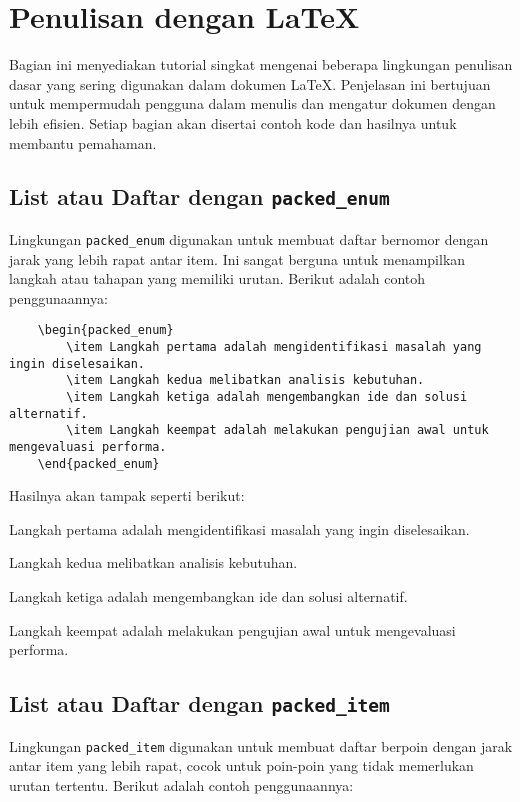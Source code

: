 \section{Penulisan dengan \LaTeX}
Bagian ini menyediakan tutorial singkat mengenai beberapa lingkungan penulisan dasar yang sering digunakan dalam dokumen LaTeX. Penjelasan ini bertujuan untuk mempermudah pengguna dalam menulis dan mengatur dokumen dengan lebih efisien. Setiap bagian akan disertai contoh kode dan hasilnya untuk membantu pemahaman.

\subsection{List atau Daftar dengan \texttt{packed\_enum}}
Lingkungan \texttt{packed\_enum} digunakan untuk membuat daftar bernomor dengan jarak yang lebih rapat antar item. Ini sangat berguna untuk menampilkan langkah atau tahapan yang memiliki urutan. Berikut adalah contoh penggunaannya:

\begin{lstlisting}
    \begin{packed_enum}
        \item Langkah pertama adalah mengidentifikasi masalah yang ingin diselesaikan.
        \item Langkah kedua melibatkan analisis kebutuhan.
        \item Langkah ketiga adalah mengembangkan ide dan solusi alternatif.
        \item Langkah keempat adalah melakukan pengujian awal untuk mengevaluasi performa.
    \end{packed_enum}
\end{lstlisting}
    
Hasilnya akan tampak seperti berikut:
\begin{packed_enum}
    \item Langkah pertama adalah mengidentifikasi masalah yang ingin diselesaikan.
    \item Langkah kedua melibatkan analisis kebutuhan.
    \item Langkah ketiga adalah mengembangkan ide dan solusi alternatif.
    \item Langkah keempat adalah melakukan pengujian awal untuk mengevaluasi performa.
\end{packed_enum}

\subsection{List atau Daftar dengan \texttt{packed\_item}}
Lingkungan \texttt{packed\_item} digunakan untuk membuat daftar berpoin dengan jarak antar item yang lebih rapat, cocok untuk poin-poin yang tidak memerlukan urutan tertentu. Berikut adalah contoh penggunaannya:

